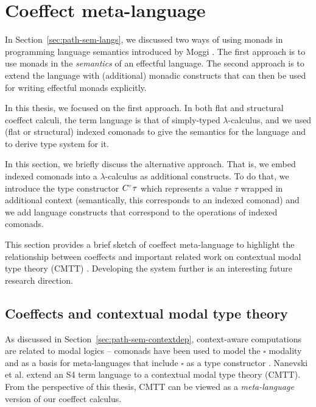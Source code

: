 \section{Coeffect meta-language}
\label{sec:unified-meta} 

In Section~\ref{sec:path-sem-langs}, we discussed two ways of using monads in programming
language semantics introduced by Moggi \cite{monad-notions}. The first approach is to use
monads in the \emph{semantics} of an effectful language. The second approach is to extend the
language with (additional) monadic constructs that can then be used for writing effectful
monads explicitly.

In this thesis, we focused on the first approach. In both flat and structural coeffect calculi,
the term language is that of simply-typed $\lambda$-calculus, and we used (flat or structural)
indexed comonads to give the semantics for the language and to derive type system for it.

In this section, we briefly discuss the alternative approach. That is, we embed indexed
comonads into a $\lambda$-calculus as additional constructs. To do that, we introduce the
type constructor $\ctyp{\cclrd{r}}{\tau}$ which represents a value $\tau$ wrapped in additional
context (semantically, this corresponds to an indexed comonad) and we add language constructs
that correspond to the operations of indexed comonads.

This section provides a brief sketch of coeffect meta-language to highlight the relationship
between coeffects and important related work on contextual modal type theory (CMTT) \cite{logic-cmtt}.
Developing the system further is an interesting future research direction.


\subsection{Coeffects and contextual modal type theory}

As discussed in Section~\ref{sec:path-sem-contextdep}, context-aware computations are related
to modal logics -- comonads have been used to model the $\square$ modality and as a basis for
meta-languages that include $\square$ as a type constructor
\cite{logic-intuitionistic-modal,logic-modal-reconstruction,logic-intuitionistic-modal,logic-cmtt}.
Nanevski et al. \cite{logic-cmtt} extend an S4 term language to a contextual modal type theory (CMTT).
From the perspective of this thesis, CMTT can be viewed as a \emph{meta-language} version of our
coeffect calculus.

